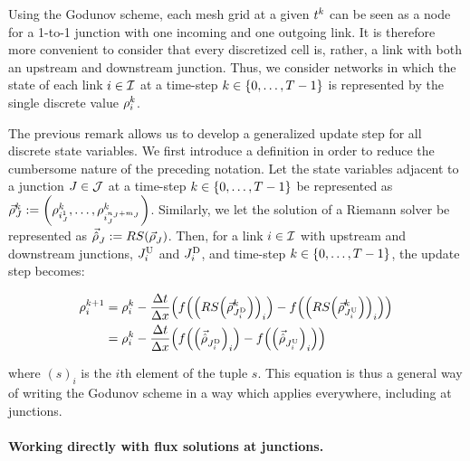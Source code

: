 						\begin{rem}
							Using the Godunov scheme, each mesh grid at a given $t^{k}$ can
							be seen as a node for a 1-to-1 junction with one incoming and one
							outgoing link. It is therefore more convenient to consider that every
							discretized cell is, rather, a link with both an upstream and downstream
							junction. Thus, we consider networks in which the state of each link
							$i\in\mathcal{I}$ at a time-step $k\in\intrange 0{\ntime-1}$ is represented
							by the single discrete value $\rho_{i}^{k}$.
						\end{rem}
						The previous remark allows us to develop a generalized update step
						for all discrete state variables. We first introduce a definition
						in order to reduce the cumbersome nature of the preceding notation.
						Let the state variables adjacent to a junction $J\in\mathcal{J}$ at a
						time-step $\tind\in\intrange 0{\ntime-1}$ be represented as $\juncstate{\jn}{\tind}\defeq\tuple{\discrete{\link_{\jn}^{1}}{\tind}}{\discrete{\link_{\jn}^{\ninc_{\jn}+\nout_{\jn}}}{\tind}}$.
						Similarly, we let the solution of a Riemann solver be represented
						as $\junctrace{\jn}{}\defeq\RS\left(\juncstate{\jn}{}\right)$. Then,
						for a link $i\in\mathcal{I}$ with upstream and downstream junctions,
						$J_{i}^{\text{U}}$ and $J_{i}^{\text{D}}$, and time-step $\tind\in\left\{ 0,\ldots,\ntime-1\right\} $,
						the update step becomes:
						
						\begin{align}
							\discrete{\link}{\tind+1} & =\discrete{\link}{\tind}-\dfrac{\Delta t}{\Delta x}\left(f\left(\left(\RS\left(\juncstate{\jdown{\link}}{\tind}\right)\right)_{\link}\right)-f\left(\left(\RS\left(\juncstate{\jup{\link}}{\tind}\right)\right)_{\link}\right)\right)\nonumber \\
							                          & =\discrete{\link}{\tind}-\dfrac{\Delta t}{\Delta x}\left(f\left(\left(\junctrace{\jdown{\link}}{}\right)_{\link}\right)-f\left(\left(\junctrace{\jup{\link}}{}\right)_{\link}\right)\right)\label{eq:reg-update}                               
						\end{align}
						
						
						where $\left(s\right)_{i}$ is the $i$th element of the tuple $s$.
						This equation is thus a general way of writing the Godunov scheme
						in a way which applies everywhere, including at junctions.
						
						
						\paragraph{Working directly with flux solutions at junctions.\label{par:Composing-the-Riemann}}
						
